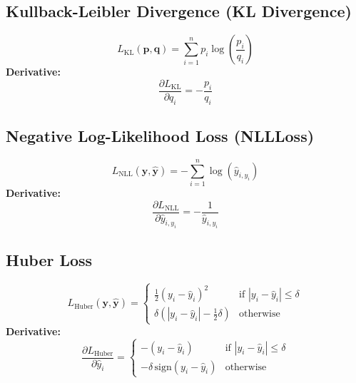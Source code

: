 \documentclass{article}
\begin{document}
\subsection{Kullback-Leibler Divergence (KL Divergence)}
\begin{equation}
L_{\text{KL}}(\mathbf{p}, \mathbf{q}) = \sum_{i=1}^{n} p_i \log \left( \frac{p_i}{q_i} \right)
\end{equation}
\textbf{Derivative:}
\begin{equation}
\frac{\partial L_{\text{KL}}}{\partial q_i} = -\frac{p_i}{q_i}
\end{equation}

\subsection{Negative Log-Likelihood Loss (NLLLoss)}
\begin{equation}
L_{\text{NLL}}(\mathbf{y}, \hat{\mathbf{y}}) = -\sum_{i=1}^{n} \log(\hat{y}_{i, y_i})
\end{equation}
\textbf{Derivative:}
\begin{equation}
\frac{\partial L_{\text{NLL}}}{\partial \hat{y}_{i, y_i}} = -\frac{1}{\hat{y}_{i, y_i}}
\end{equation}

\subsection{Huber Loss}
\begin{equation}
L_{\text{Huber}}(\mathbf{y}, \hat{\mathbf{y}}) = 
\begin{cases} 
\frac{1}{2} (y_i - \hat{y}_i)^2 & \text{if } |y_i - \hat{y}_i| \leq \delta \\
\delta (|y_i - \hat{y}_i| - \frac{1}{2} \delta) & \text{otherwise}
\end{cases}
\end{equation}
\textbf{Derivative:}
\begin{equation}
\frac{\partial L_{\text{Huber}}}{\partial \hat{y}_i} = 
\begin{cases} 
-(y_i - \hat{y}_i) & \text{if } |y_i - \hat{y}_i| \leq \delta \\
-\delta \, \text{sign}(y_i - \hat{y}_i) & \text{otherwise}
\end{cases}
\end{equation}
\end{document}
